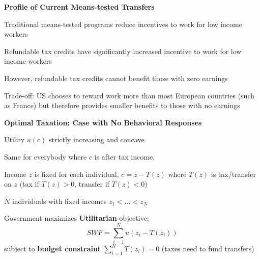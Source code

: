 \documentclass[landscape]{slides}
\begin{document}
\begin{slide}

\end{slide}



\begin{slide}

\end{slide}


\begin{slide}

\end{slide}

\begin{slide}
\begin{center}
{\bf Profile of Current Means-tested Transfers}
\end{center}
Traditional means-tested programs reduce incentives to work for low income
workers

Refundable tax credits have significantly increased incentive to work
for low income workers

However, refundable tax credits cannot benefit those with zero earnings

Trade-off: US chooses to reward work more than most European countries (such as France) but therefore
provides smaller benefits to those with no earnings

\end{slide}


\begin{slide}
\begin{center}
{\bf Optimal Taxation: Case with No Behavioral Responses}
\end{center}

Utility $u(c)$ strictly increasing and concave

Same for everybody where $c$ is after tax income.

Income $z$ is fixed for each individual, $c=z-T(z)$ where
$T(z)$ is tax/transfer on $z$ (tax if $T(z)>0$, transfer if $T(z)<0$)

$N$ individuals with fixed incomes $z_1<...<z_N$

Government maximizes {\bf Utilitarian} objective:
\[ SWF = \sum_{i=1}^N u(z_i-T(z_i)) \]
subject to {\bf budget constraint} $\sum_{i=1}^N T(z_i) = 0$ (taxes need to fund transfers)

\end{slide}
\end{document}
